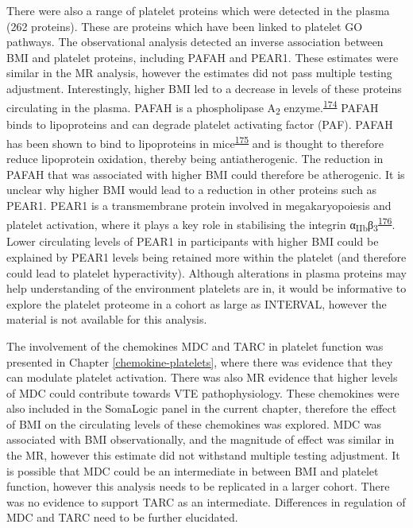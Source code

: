 \documentclass[11pt,twoside]{bristolthesis}
\begin{document}
There were also a range of platelet proteins which were detected in the plasma (262 proteins). These are proteins which have been linked to platelet GO pathways. The observational analysis detected an inverse association between BMI and platelet proteins, including PAFAH and PEAR1. These estimates were similar in the MR analysis, however the estimates did not pass multiple testing adjustment. Interestingly, higher BMI led to a decrease in levels of these proteins circulating in the plasma. PAFAH is a phospholipase A\textsubscript{2} enzyme.\textsuperscript{\protect\hyperlink{ref-Marathe2018}{174}} PAFAH binds to lipoproteins and can degrade platelet activating factor (PAF). PAFAH has been shown to bind to lipoproteins in mice\textsuperscript{\protect\hyperlink{ref-Noto2003}{175}} and is thought to therefore reduce lipoprotein oxidation, thereby being antiatherogenic. The reduction in PAFAH that was associated with higher BMI could therefore be atherogenic. It is unclear why higher BMI would lead to a reduction in other proteins such as PEAR1. PEAR1 is a transmembrane protein involved in megakaryopoiesis and platelet activation, where it plays a key role in stabilising the integrin α\textsubscript{IIb}β\textsubscript{3}\textsuperscript{\protect\hyperlink{ref-Kauskot2012}{176}}. Lower circulating levels of PEAR1 in participants with higher BMI could be explained by PEAR1 levels being retained more within the platelet (and therefore could lead to platelet hyperactivity). Although alterations in plasma proteins may help understanding of the environment platelets are in, it would be informative to explore the platelet proteome in a cohort as large as INTERVAL, however the material is not available for this analysis.

The involvement of the chemokines MDC and TARC in platelet function was presented in Chapter \ref{chemokine-platelets}, where there was evidence that they can modulate platelet activation. There was also MR evidence that higher levels of MDC could contribute towards VTE pathophysiology. These chemokines were also included in the SomaLogic panel in the current chapter, therefore the effect of BMI on the circulating levels of these chemokines was explored. MDC was associated with BMI observationally, and the magnitude of effect was similar in the MR, however this estimate did not withstand multiple testing adjustment. It is possible that MDC could be an intermediate in between BMI and platelet function, however this analysis needs to be replicated in a larger cohort. There was no evidence to support TARC as an intermediate. Differences in regulation of MDC and TARC need to be further elucidated.
\end{document}
